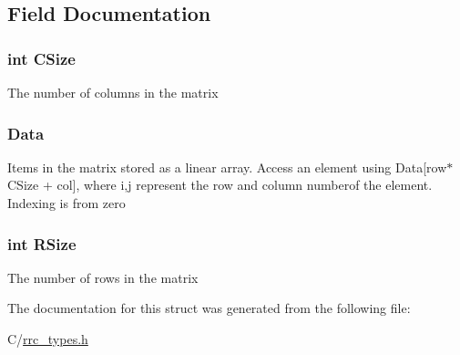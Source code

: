 \subsection{Field Documentation}
\hypertarget{struct_r_r_complex_matrix_a17c9a5894aa9cb3789346dcaa9c370bb}{
\subsubsection[{C\-Size}]{\setlength{\rightskip}{0pt plus 5cm}int C\-Size}}\label{struct_r_r_complex_matrix_a17c9a5894aa9cb3789346dcaa9c370bb}
The number of columns in the matrix \hypertarget{struct_r_r_complex_matrix_a2853286fc6b37960bba4c8871da839fa}{
\subsubsection[{Data}]{ Data}}\label{struct_r_r_complex_matrix_a2853286fc6b37960bba4c8871da839fa}
Items in the matrix stored as a linear array. Access an element using Data\mbox{[}row$\ast$\-C\-Size + col\mbox{]}, where i,j represent the row and column numberof the element. Indexing is from zero \hypertarget{struct_r_r_complex_matrix_a4d8512c879223c0e0d1522dae38e7819}{
\subsubsection[{R\-Size}]{\setlength{\rightskip}{0pt plus 5cm}int R\-Size}}\label{struct_r_r_complex_matrix_a4d8512c879223c0e0d1522dae38e7819}
The number of rows in the matrix 

The documentation for this struct was generated from the following file\-:\begin{DoxyCompactItemize}
\item 
C/\hyperlink{rrc__types_8h}{rrc\-\_\-types.\-h}\end{DoxyCompactItemize}
